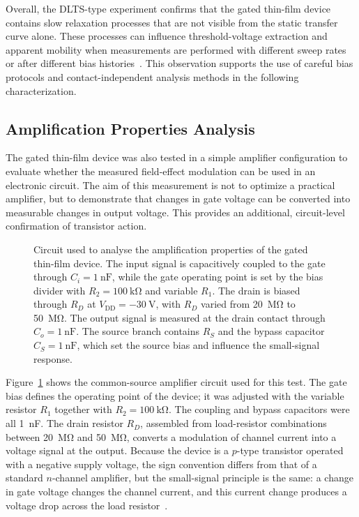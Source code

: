 Overall, the DLTS-type experiment confirms that the gated thin-film device contains slow relaxation processes that are not visible from the static transfer curve alone. These processes can influence threshold-voltage extraction and apparent mobility when measurements are performed with different sweep rates or after different bias histories~\cite{Bobbert2012OperationalStability,Hirwa2015TrapStates}. This observation supports the use of careful bias protocols and contact-independent analysis methods in the following characterization.

\subsection{Amplification Properties Analysis}

The gated thin-film device was also tested in a simple amplifier configuration to evaluate whether the measured field-effect modulation can be used in an electronic circuit. The aim of this measurement is not to optimize a practical amplifier, but to demonstrate that changes in gate voltage can be converted into measurable changes in output voltage. This provides an additional, circuit-level confirmation of transistor action.

\begin{figure}[htbp]
\centering
\resizebox{0.65\textwidth}{!}{}
\caption[OFET amplification measurement circuit]{Circuit used to analyse the amplification properties of the gated thin-film device. The input signal is capacitively coupled to the gate through $C_i=\SI{1}{\nano\farad}$, while the gate operating point is set by the bias divider with $R_2=\SI{100}{\kilo\ohm}$ and variable $R_1$. The drain is biased through $R_D$ at $V_\text{DD}=\SI{-30}{\volt}$, with $R_D$ varied from \SI{20}{\mega\ohm} to \SI{50}{\mega\ohm}. The output signal is measured at the drain contact through $C_o=\SI{1}{\nano\farad}$. The source branch contains $R_S$ and the bypass capacitor $C_S=\SI{1}{\nano\farad}$, which set the source bias and influence the small-signal response.}
\label{fig:ofet_amplification_circuit}
\end{figure}

Figure~\ref{fig:ofet_amplification_circuit} shows the common-source amplifier circuit used for this test. The gate bias defines the operating point of the device; it was adjusted with the variable resistor $R_1$ together with $R_2=\SI{100}{\kilo\ohm}$. The coupling and bypass capacitors were all \SI{1}{\nano\farad}. The drain resistor $R_D$, assembled from load-resistor combinations between \SI{20}{\mega\ohm} and \SI{50}{\mega\ohm}, converts a modulation of channel current into a voltage signal at the output. Because the device is a $p$-type transistor operated with a negative supply voltage, the sign convention differs from that of a standard $n$-channel amplifier, but the small-signal principle is the same: a change in gate voltage changes the channel current, and this current change produces a voltage drop across the load resistor~\cite{Neamen,Lundstrom2023Transistors}.




